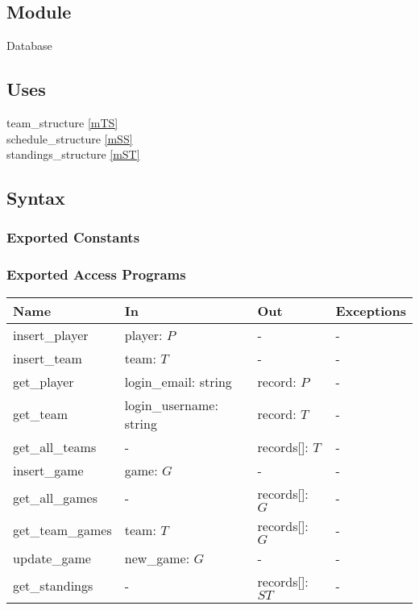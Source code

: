\documentclass[12pt, titlepage]{article}
\begin{document}
\subsection{Module}

Database

\subsection{Uses}

team\_structure \ref{mTS} \\
schedule\_structure \ref{mSS} \\
standings\_structure \ref{mST}

\subsection{Syntax}

\subsubsection{Exported Constants}

\subsubsection{Exported Access Programs}

\begin{center}
\begin{tabular}{p{4cm} p{4.5cm} p{2.5cm} p{2cm}}
\hline
\textbf{Name} & \textbf{In} & \textbf{Out} & \textbf{Exceptions} \\
\hline
insert\_player & player: $P$ & - & - \\
insert\_team & team: $T$ & - & - \\
get\_player & login\_email: string & record: $P$ & - \\
get\_team & login\_username: string & record: $T$ & - \\
get\_all\_teams & - & records[]: $T$ & - \\
insert\_game & game: $G$ & - & - \\
get\_all\_games & - & records[]: $G$ & - \\
get\_team\_games & team: $T$ & records[]: $G$ & - \\
update\_game & new\_game: $G$ & - & - \\
get\_standings & - & records[]: $ST$ & - \\
\hline
\end{tabular}
\end{center}
\end{document}
